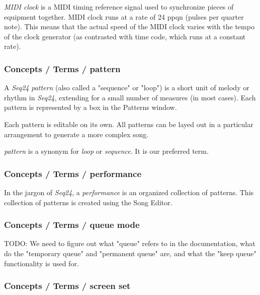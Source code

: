    \textsl{MIDI clock} is
   a MIDI timing reference signal used to synchronize pieces of equipment
   together. MIDI clock runs at a rate of 24 ppqn (pulses per quarter note).
   This means that the actual speed of the MIDI clock varies with the tempo
   of the clock generator (as contrasted with time code, which runs at a
   constant rate).

\subsubsection{Concepts / Terms / pattern}
\label{subsubsec:concepts_terms_pattern}

   A \textsl{Seq24} \textsl{pattern}
   (also called a "sequence" or "loop")
   is a short unit of melody or rhythm in \textsl{Seq24},
   extending for a small number of measures (in most cases).
   Each pattern is represented by a box in the Patterns window.

   Each pattern is editable on its own.  All patterns can be layed out in
   a particular arrangement to generate a more complex song.

   \textsl{pattern} is a synonym for \textsl{loop} or \textsl{sequence}.
   It is our preferred term.

\subsubsection{Concepts / Terms / performance}
\label{subsubsec:concepts_terms_performance}

   In the jargon of \textsl{Seq24}, a
   \textsl{performance} is an organized collection of patterns.
   This collection of patterns is created using the Song Editor.

\subsubsection{Concepts / Terms / queue mode}
\label{subsubsec:concepts_terms_queue_mode}

   TODO:  
   We need to figure out what "queue" refers to in the documentation, what
   do the "temporary queue" and "permanent queue" are, and what the "keep
   queue" functionality is used for.

\subsubsection{Concepts / Terms / screen set}
\label{subsubsec:concepts_terms_screen_set}

